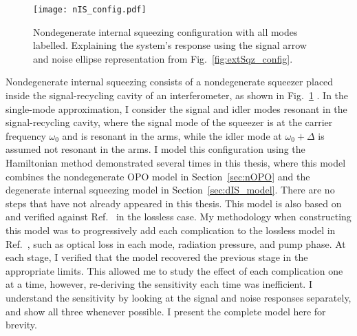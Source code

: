 \begin{figure}
	\centering
	\texttt{[image: nIS\_config.pdf]}
	\caption{  Nondegenerate internal squeezing configuration with all modes labelled. Explaining the system's response using the signal arrow and noise ellipse representation from Fig.~\ref{fig:extSqz_config}.}
	\label{fig:nIS_config}
\end{figure}

Nondegenerate internal squeezing consists of a nondegenerate squeezer placed inside the signal-recycling cavity of an interferometer, as shown in Fig.~\ref{fig:nIS_config} . In the single-mode approximation, I consider the signal and idler modes resonant in the signal-recycling cavity, where the signal mode of the squeezer is at the carrier frequency $\omega_0$ and is resonant in the arms, while the idler mode at $\omega_0+\Delta$ is assumed not resonant in the arms. 
I model this configuration using the Hamiltonian method demonstrated several times in this thesis, where this model combines the nondegenerate OPO model in Section~\ref{sec:nOPO} and the degenerate internal squeezing model in Section~\ref{sec:dIS_model}. There are no steps that have not already appeared in this thesis. This model is also based on and verified against Ref.~\cite{Li2020} in the lossless case. 
My methodology when constructing this model was to progressively add each complication to the lossless model in Ref.~\cite{Li2020}, such as optical loss in each mode, radiation pressure, and pump phase. At each stage, I verified that the model recovered the previous stage in the appropriate limits. This allowed me to study the effect of each complication one at a time, however, re-deriving the sensitivity each time was inefficient. I understand the sensitivity by looking at the signal and noise responses separately, and show all three whenever possible.  I present the complete model here for brevity.

